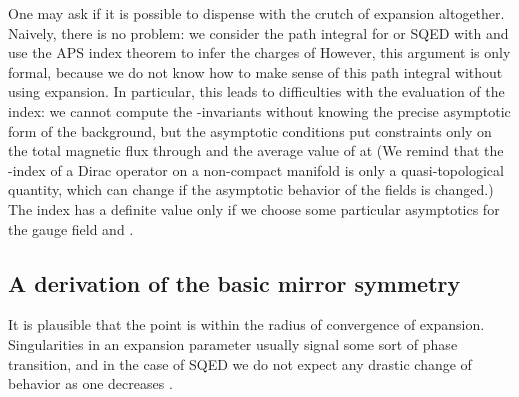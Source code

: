 \documentclass[a4paper,12pt, amsfonts, amssymb]{article}
\renewcommand{\SS}{{\mathbb S}}
\begin{document}
One may ask if it is possible to dispense with the crutch of \coordHE{} expansion
altogether. Naively, there is no problem: we consider the path
integral for \coordHE{} or \coordHE{} SQED with \coordHE{} and use the
APS index theorem to infer the charges of \coordHE{} However, this
argument is only formal, because we do not know how to make sense
of this path integral without using \coordHE{} expansion. In particular,
this leads to difficulties with the evaluation of the index: we cannot compute
the \myHighlight{$\eta$}\coordHE{}-invariants without knowing the precise asymptotic form of the
background, but the asymptotic conditions put constraints only on
the total magnetic flux through \myHighlight{$\SS^2$}\coordHE{} and the average value of
\myHighlight{$\chi$}\coordHE{} at \coordHE{} (We remind that the \coordHE{}-index of a Dirac
operator on a non-compact manifold is only a quasi-topological quantity,
which can change if the asymptotic behavior of the fields is changed.)
The index has a definite value only if we choose some particular
asymptotics for the gauge field and \myHighlight{$\chi$}\coordHE{}.


\subsection{A derivation of the basic \coordHE{} mirror symmetry}

It is plausible that the point \coordHE{} is within the radius of convergence
of \coordHE{} expansion. Singularities in an expansion parameter usually
signal some sort of phase transition, and in the case of \coordHE{} SQED we do not
expect any drastic change of behavior as one decreases \coordHE{}.
\end{document}
